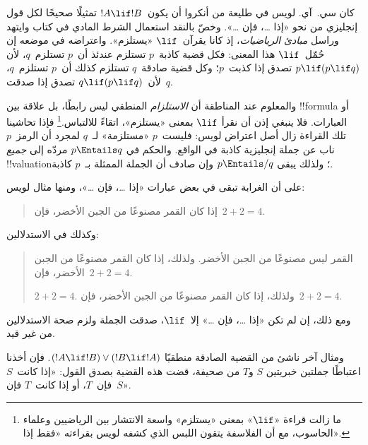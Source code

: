 \documentclass[../../../include/open-logic-section]{subfiles}
\begin{document}


كان سي.~آي. لويس في طليعة من أنكروا أن يكون~$!A \lif !B$ تمثيلًا
صحيحًا لكل قول إنجليزي من نحو «إذا \dots، فإن \dots». وخصّ بالنقد
استعمال الشرط المادي في كتاب وايتهد وراسل \emph{مبادئ الرياضيات}، إذ
كانا يقرآن~$\lif$ «يستلزم». واعتراضه في موضعه إن حُمّل~$\lif$ هذا
المعنى: فكل قضية كاذبة~$p$ تستلزم عندئذ أن~$p$ تستلزم~$q$، لأن
$p \lif (p \lif q)$ تصدق إذا كذبت~$p$؛ وكل قضية صادقة~$q$ تستلزم
كذلك أن~$p$ تستلزم~$q$، لأن~$q \lif (p \lif q)$ تصدق إذا صدقت~$q$.

والمعلوم عند المناطقة أن \emph{الاستلزام} المنطقي ليس رابطًا، بل علاقة
بين !!{formula} أو العبارات. فلا ينبغي إذن أن نقرأ
$\lif$ بمعنى «يستلزم»، اتقاءً للالتباس.\footnote{ما زالت قراءة
  «$\lif$» بمعنى «يستلزم» واسعة الانتشار بين الرياضيين وعلماء الحاسوب،
  مع أن الفلاسفة يتقون اللبس الذي كشفه لويس بقراءته «فقط إذا».} فإذا
تحاشينا تلك القراءة زال أصل اعتراض لويس: فليست~$p$ «مستلزمة» لـ~$q$
لمجرد أن الرمز~$p$ ناب عن جملة إنجليزية كاذبة في الواقع. والحكم في
$p \Entails q$ مردّه إلى \emph{جميع} !!{valuation}؛ ولذلك يبقى
$p \Entails/ q$ وإن صادف أن الجملة الممثلة بـ~$p$ كاذبة.

على أن الغرابة تبقى في بعض عبارات «إذا \dots، فإن \dots»، ومنها مثال
لويس:
\begin{quote}
إذا كان القمر مصنوعًا من الجبن الأخضر، فإن~$2+2=4$.
\end{quote}
وكذلك في الاستدلالين:
\begin{quote}
  القمر ليس مصنوعًا من الجبن الأخضر. ولذلك، إذا كان القمر مصنوعًا
  من الجبن الأخضر، فإن~$2+2=4$.

  $2+2 = 4$. ولذلك، إذا كان القمر مصنوعًا
  من الجبن الأخضر، فإن~$2+2=4$.
\end{quote}
ومع ذلك، إن لم تكن «إذا \dots، فإن \dots» إلا~$\lif$، صدقت الجملة
ولزم صحة الاستدلالين من غير قيد.

ومثال آخر ناشئ من القضية الصادقة منطقيًا
$(!A \lif !B) \lor (!B \lif !A)$. فإن أخذنا اعتباطًا جملتين خبريتين
$S$ و$T$ من صحيفة، قضت هذه القضية بصدق القول: «إذا كانت~$S$ فإن~$T$،
أو إذا كانت~$T$ فإن~$S$».
\end{document}
